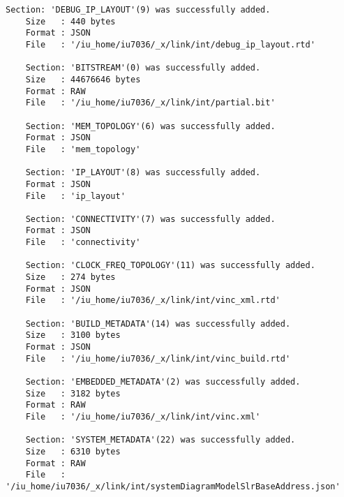 \begin{lstlisting}[caption=Содержимое файла v++\_vinc.log, label={log1}]
	Section: 'DEBUG_IP_LAYOUT'(9) was successfully added.
	Size   : 440 bytes
	Format : JSON
	File   : '/iu_home/iu7036/_x/link/int/debug_ip_layout.rtd'
	
	Section: 'BITSTREAM'(0) was successfully added.
	Size   : 44676646 bytes
	Format : RAW
	File   : '/iu_home/iu7036/_x/link/int/partial.bit'
	
	Section: 'MEM_TOPOLOGY'(6) was successfully added.
	Format : JSON
	File   : 'mem_topology'
	
	Section: 'IP_LAYOUT'(8) was successfully added.
	Format : JSON
	File   : 'ip_layout'
	
	Section: 'CONNECTIVITY'(7) was successfully added.
	Format : JSON
	File   : 'connectivity'
	
	Section: 'CLOCK_FREQ_TOPOLOGY'(11) was successfully added.
	Size   : 274 bytes
	Format : JSON
	File   : '/iu_home/iu7036/_x/link/int/vinc_xml.rtd'
	
	Section: 'BUILD_METADATA'(14) was successfully added.
	Size   : 3100 bytes
	Format : JSON
	File   : '/iu_home/iu7036/_x/link/int/vinc_build.rtd'
	
	Section: 'EMBEDDED_METADATA'(2) was successfully added.
	Size   : 3182 bytes
	Format : RAW
	File   : '/iu_home/iu7036/_x/link/int/vinc.xml'
	
	Section: 'SYSTEM_METADATA'(22) was successfully added.
	Size   : 6310 bytes
	Format : RAW
	File   : '/iu_home/iu7036/_x/link/int/systemDiagramModelSlrBaseAddress.json'
	

\end{lstlisting}
